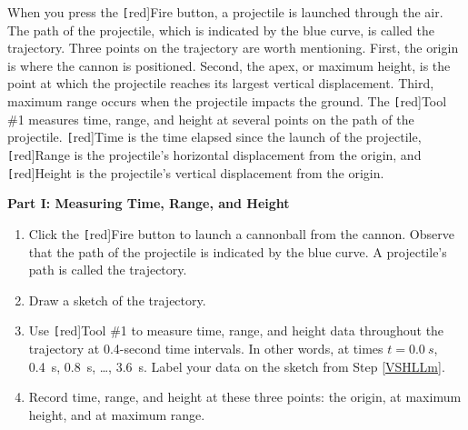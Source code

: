 \documentclass[main-physics.tex]{subfiles}
\begin{document}
When you press the \texttt[red]{Fire} button, a projectile is launched through the air. The path of the projectile, which is indicated by the blue curve, is called the trajectory. Three points on the trajectory are worth mentioning. First, the origin is where the cannon is positioned. Second, the \gls{apex}, or maximum height, is the point at which the projectile reaches its largest vertical displacement. Third, maximum range occurs when the projectile impacts the ground. The \texttt[red]{Tool \#1} measures time, range, and height at several points on the path of the projectile. \texttt[red]{Time} is the time elapsed since the launch of the projectile, \texttt[red]{Range} is the projectile's horizontal displacement from the origin, and \texttt[red]{Height} is the projectile's vertical displacement from the origin. 

\begin{center}
\def\thetai{60}
\end{center}

\clearpage

\textbf{Part I: Measuring Time, Range, and Height}

\begin{enumerate}
    \item Click the \texttt[red]{Fire} button to launch a cannonball from the cannon. Observe that the path of the projectile is indicated by the blue curve. A projectile's path is called the trajectory.
    \item Draw a sketch of the trajectory. 
    \item \label{VSHLLm} Use \texttt[red]{Tool \#1} to measure time, range, and height data throughout the trajectory at 0.4-second time intervals. In other words, at times $t=\SI{0.0}{s}$, \SI{0.4}{s}, \SI{0.8}{s}, \ldots, \SI{3.6}{s}. Label your data on the sketch from Step \ref{VSHLLm}.
    \item Record time, range, and height at these three points: the origin, at maximum height, and at maximum range.
\end{enumerate}
\end{document}

